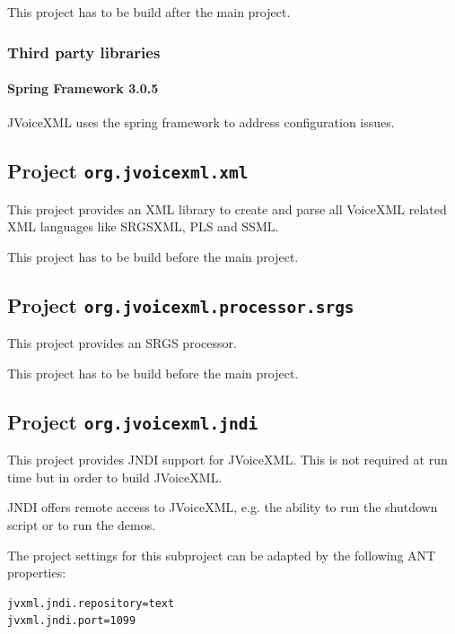 \documentclass[11pt,a4paper]{article}
\begin{document}
This project has to be build after the main project.

\subsubsection{Third party libraries}
\label{sec:config-third-party-libr}

\paragraph{Spring Framework 3.0.5}
\label{sec:spring-framework}

JVoiceXML uses the spring framework to address configuration issues.

\subsection{Project \texttt{org.jvoicexml.xml}}
\label{sec:org.jvoicexml.xml}

This project provides an XML library to create and parse all VoiceXML related
XML languages like SRGSXML, PLS and SSML.

This project has to be build before the main project.

\subsection{Project \texttt{org.jvoicexml.processor.srgs}}
\label{sec:org.jvoicexml.processor.srgs}

This project provides an SRGS processor.

This project has to be build before the main project.

\subsection{Project \texttt{org.jvoicexml.jndi}}

This project provides JNDI support for JVoiceXML. This is not required at run
time but in order to build JVoiceXML.

JNDI offers remote access to JVoiceXML, e.g. the ability to run the
shutdown script or to run the demos.

The project settings for this subproject can be adapted by the following ANT
properties:
\begin{lstlisting}
jvxml.jndi.repository=text
jvxml.jndi.port=1099
\end{lstlisting}
\end{document}

